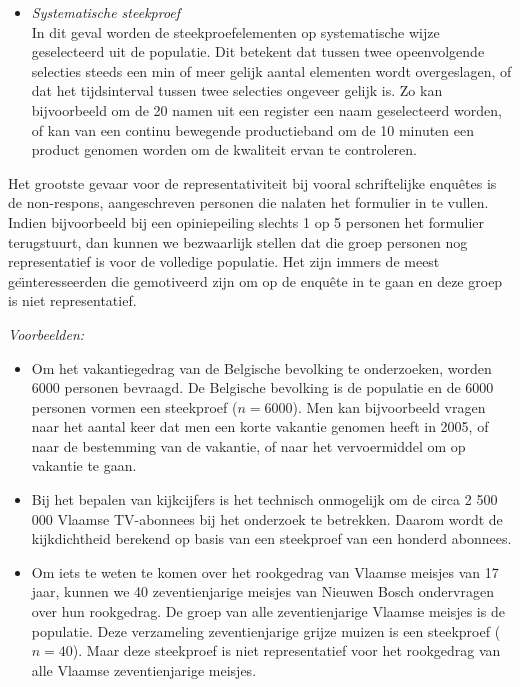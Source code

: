 \begin{small}
\begin{description}
\begin{itemize}
\item {\em Systematische steekproef}\\
In dit geval worden de steekproefelementen op systematische wijze geselecteerd uit de populatie. Dit betekent dat tussen twee opeenvolgende selecties steeds een min of meer gelijk aantal elementen wordt overgeslagen, of dat het tijdsinterval tussen twee selecties ongeveer gelijk is. Zo kan bijvoorbeeld om de 20 namen uit een register een naam geselecteerd worden, of kan van een continu bewegende productieband om de 10 minuten een product genomen worden om de kwaliteit ervan te controleren.
\end{itemize}

Het grootste gevaar voor de representativiteit bij vooral schriftelijke enqu\^etes is de non-respons, aangeschreven personen die nalaten het formulier in te vullen. Indien bijvoorbeeld bij een opiniepeiling slechts 1 op 5 personen het formulier terugstuurt, dan kunnen we bezwaarlijk stellen dat die groep personen nog representatief is voor de volledige populatie. Het zijn immers de meest ge\"\i nteresseerden die gemotiveerd zijn om op de enqu\^ete in te gaan en deze groep is niet representatief.







\newpage
{\em Voorbeelden:}
\begin{itemize}
\item Om het vakantiegedrag van de Belgische bevolking te onderzoeken, worden 6000 personen bevraagd.
De Belgische bevolking is de populatie en de 6000 personen vormen een steekproef ($n=6000$). Men kan bijvoorbeeld vragen naar het aantal keer dat men een korte vakantie genomen heeft in 2005, of naar de bestemming van de vakantie, of naar het vervoermiddel om op vakantie te gaan. 
\item Bij het bepalen van kijkcijfers is het technisch onmogelijk om de circa 2 500 000 Vlaamse TV-abonnees bij het onderzoek te betrekken. Daarom wordt de kijkdichtheid berekend op basis van een steekproef van een honderd abonnees.

\item  Om iets te weten te komen over het rookgedrag van Vlaamse meisjes van 17 jaar, kunnen we 40 zeventienjarige meisjes van Nieuwen Bosch ondervragen over hun rookgedrag. De groep van alle zeventienjarige Vlaamse meisjes is de populatie. 
 Deze verzameling zeventienjarige grijze muizen is een steekproef ($n=40$). Maar deze steekproef is niet representatief voor het rookgedrag van alle Vlaamse zeventienjarige meisjes.


\end{itemize}
\end{description}
\end{small}
